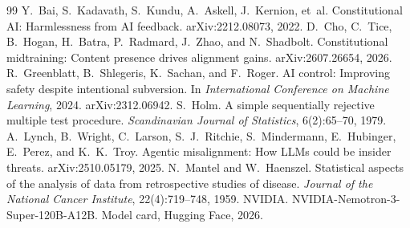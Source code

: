 \documentclass[10pt]{article}
\begin{document}
\begin{thebibliography}{99}\small
{} Y.~Bai, S.~Kadavath, S.~Kundu, A.~Askell, J.~Kernion, et~al. Constitutional AI: Harmlessness from AI feedback. arXiv:2212.08073, 2022.
 D.~Cho, C.~Tice, B.~Hogan, H.~Batra, P.~Radmard, J.~Zhao, and N.~Shadbolt. Constitutional midtraining: Content presence drives alignment gains. arXiv:2607.26654, 2026.
 R.~Greenblatt, B.~Shlegeris, K.~Sachan, and F.~Roger. AI control: Improving safety despite intentional subversion. In \emph{International Conference on Machine Learning}, 2024. arXiv:2312.06942.
 S.~Holm. A simple sequentially rejective multiple test procedure. \emph{Scandinavian Journal of Statistics}, 6(2):65--70, 1979.
 A.~Lynch, B.~Wright, C.~Larson, S.~J.~Ritchie, S.~Mindermann, E.~Hubinger, E.~Perez, and K.~K.~Troy. Agentic misalignment: How LLMs could be insider threats. arXiv:2510.05179, 2025.
 N.~Mantel and W.~Haenszel. Statistical aspects of the analysis of data from retrospective studies of disease. \emph{Journal of the National Cancer Institute}, 22(4):719--748, 1959.
 NVIDIA. NVIDIA-Nemotron-3-Super-120B-A12B. Model card, Hugging Face, 2026.


\end{thebibliography}
\end{document}
